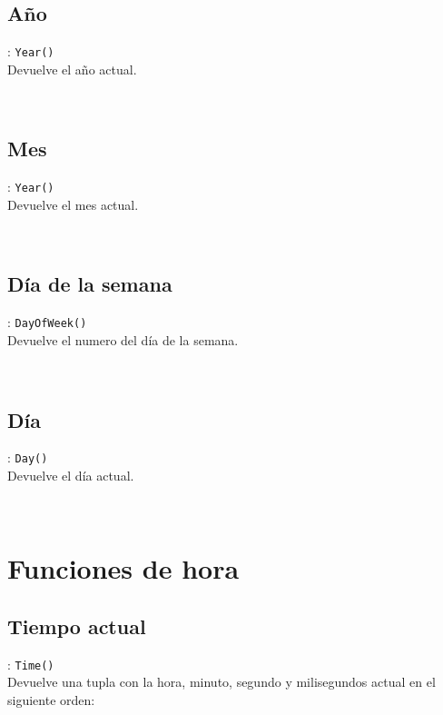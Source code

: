      \subsection*{Año}: \texttt{Year()}\\
      Devuelve el año actual.
      
      \begin{fxcode}
         \\
      \end{fxcode}
      
      \subsection*{Mes}: \texttt{Year()}\\
      Devuelve el mes actual.
      
      \begin{fxcode}
         \\
      \end{fxcode}
      
      \subsection*{Día de la semana}: \texttt{DayOfWeek()}\\
      Devuelve el numero del día de la semana.
      
      \begin{fxcode}
         \\
      \end{fxcode}
      
      \subsection*{Día}: \texttt{Day()}\\
      Devuelve el día actual.
      
      \begin{fxcode}
         \\
      \end{fxcode}
      
   \section{Funciones de hora}
   
      \subsection*{Tiempo actual}: \texttt{Time()}\\
      Devuelve una tupla con la hora, minuto, segundo y milisegundos actual en el siguiente orden:
      \\
      
